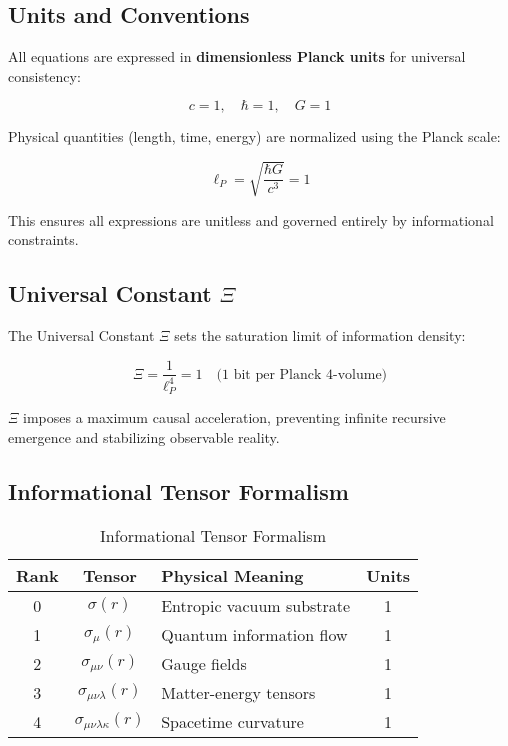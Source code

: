 \documentclass[12pt,a4paper]{article}
\begin{document}
\subsection{Units and Conventions}

All equations are expressed in \textbf{dimensionless Planck units} for universal consistency:

\[
c = 1, \quad \hbar = 1, \quad G = 1
\]

Physical quantities (length, time, energy) are normalized using the Planck scale:

\[
\ell_P = \sqrt{\frac{\hbar G}{c^3}} = 1
\]

This ensures all expressions are unitless and governed entirely by informational constraints.

\subsection{Universal Constant \(\Xi\)}

The Universal Constant \(\Xi\) sets the saturation limit of information density:

\[
\Xi = \frac{1}{\ell_P^4} = 1 \quad \text{(1 bit per Planck 4-volume)}
\]

\(\Xi\) imposes a maximum causal acceleration, preventing infinite recursive emergence and stabilizing observable reality.

\subsection{Informational Tensor Formalism}

\begin{table}[h]
\centering
\begin{tabular}{|c|c|l|c|}
\hline
\textbf{Rank} & \textbf{Tensor} & \textbf{Physical Meaning} & \textbf{Units} \\
\hline
0 & \(\sigma(r)\) & Entropic vacuum substrate & 1 \\
1 & \(\sigma_\mu(r)\) & Quantum information flow & 1 \\
2 & \(\sigma_{\mu\nu}(r)\) & Gauge fields & 1 \\
3 & \(\sigma_{\mu\nu\lambda}(r)\) & Matter-energy tensors & 1 \\
4 & \(\sigma_{\mu\nu\lambda\kappa}(r)\) & Spacetime curvature & 1 \\
\hline
\end{tabular}
\caption{Informational Tensor Formalism}
\end{table}
\end{document}
